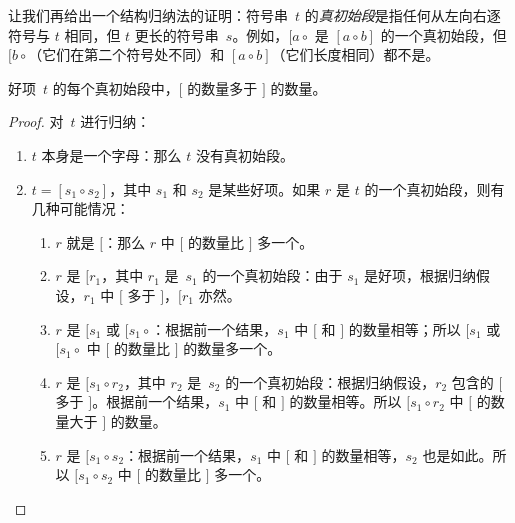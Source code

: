 \documentclass[../../../include/open-logic-section]{subfiles}
\begin{document}
让我们再给出一个结构归纳法的证明：符号串~$t$ 的\emph{真初始段}是指任何从左向右逐符号与 $t$ 相同，但 $t$ 更长的符号串~$s$。例如，$[a \circ {}$ 是 $[a \circ b]$ 的一个真初始段，但 $[b \circ {}$（它们在第二个符号处不同）和 $[a \circ b]$（它们长度相同）都不是。

\begin{prop}
  好项~$t$ 的每个真初始段中，$[$ 的数量多于 $]$ 的数量。
\end{prop}

\begin{proof}
  对~$t$ 进行归纳：
  \begin{enumerate}
  \item $t$ 本身是一个字母：那么 $t$ 没有真初始段。
  \item $t = [s_1 \circ s_2]$，其中 $s_1$ 和 $s_2$ 是某些好项。如果 $r$ 是 $t$ 的一个真初始段，则有几种可能情况：
    \begin{enumerate}
    \item $r$ 就是 $[$：那么 $r$ 中 $[$ 的数量比 $]$ 多一个。
    \item $r$ 是 $[r_1$，其中 $r_1$ 是~$s_1$ 的一个真初始段：由于 $s_1$ 是好项，根据归纳假设，$r_1$ 中 $[$ 多于 $]$，$[r_1$ 亦然。
    \item $r$ 是 $[s_1$ 或 $[s_1 \circ {}$：根据前一个结果，$s_1$ 中 $[$ 和 $]$ 的数量相等；所以 $[s_1$ 或 $[s_1 \circ {}$ 中 $[$ 的数量比 $]$ 的数量多一个。
    \item $r$ 是 $[s_1 \circ r_2$，其中 $r_2$ 是~$s_2$ 的一个真初始段：根据归纳假设，$r_2$ 包含的 $[$ 多于 $]$。根据前一个结果，$s_1$ 中 $[$ 和 $]$ 的数量相等。所以 $[s_1 \circ r_2$ 中 $[$ 的数量大于 $]$ 的数量。
    \item $r$ 是 $[s_1 \circ s_2$：根据前一个结果，$s_1$ 中 $[$ 和 $]$ 的数量相等，$s_2$ 也是如此。所以 $[s_1 \circ s_2$ 中 $[$ 的数量比 $]$ 多一个。
    \end{enumerate}
  \end{enumerate}
\end{proof}
\end{document}
